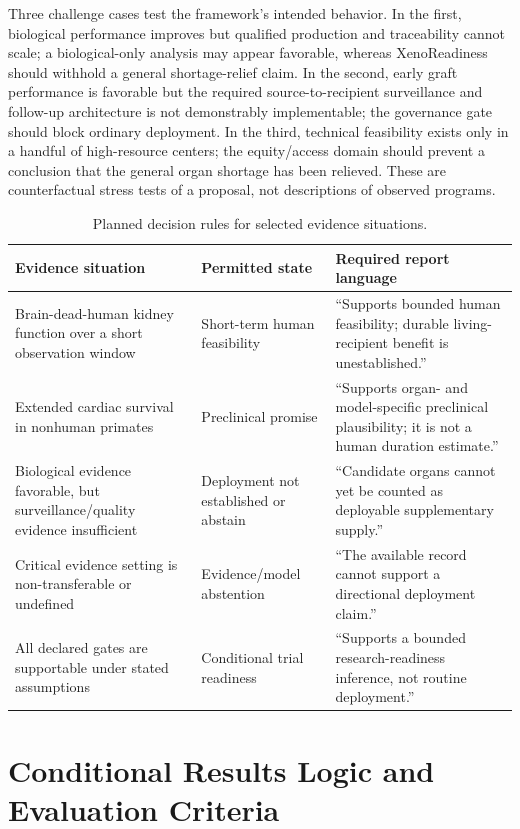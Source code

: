 \documentclass[conference]{IEEEtran}
\begin{document}
Three challenge cases test the framework's intended behavior. In the first, biological performance improves but qualified production and traceability cannot scale; a biological-only analysis may appear favorable, whereas XenoReadiness should withhold a general shortage-relief claim. In the second, early graft performance is favorable but the required source-to-recipient surveillance and follow-up architecture is not demonstrably implementable; the governance gate should block ordinary deployment. In the third, technical feasibility exists only in a handful of high-resource centers; the equity/access domain should prevent a conclusion that the general organ shortage has been relieved. These are counterfactual stress tests of a proposal, not descriptions of observed programs.

\begin{table}[t]
\caption{Planned decision rules for selected evidence situations.}
\label{tab:decision-rules}
\centering
\scriptsize
\renewcommand{\arraystretch}{1.12}
\begin{tabular}{|p{}|p{}|p{}|}
\hline
\textbf{Evidence situation} & \textbf{Permitted state} & \textbf{Required report language} \\
\hline
Brain-dead-human kidney function over a short observation window & Short-term human feasibility & ``Supports bounded human feasibility; durable living-recipient benefit is unestablished.'' \\
\hline
Extended cardiac survival in nonhuman primates & Preclinical promise & ``Supports organ- and model-specific preclinical plausibility; it is not a human duration estimate.'' \\
\hline
Biological evidence favorable, but surveillance/quality evidence insufficient & Deployment not established or abstain & ``Candidate organs cannot yet be counted as deployable supplementary supply.'' \\
\hline
Critical evidence setting is non-transferable or undefined & Evidence/model abstention & ``The available record cannot support a directional deployment claim.'' \\
\hline
All declared gates are supportable under stated assumptions & Conditional trial readiness & ``Supports a bounded research-readiness inference, not routine deployment.'' \\
\hline
\end{tabular}
\end{table}

\section{Conditional Results Logic and Evaluation Criteria}
\end{document}
